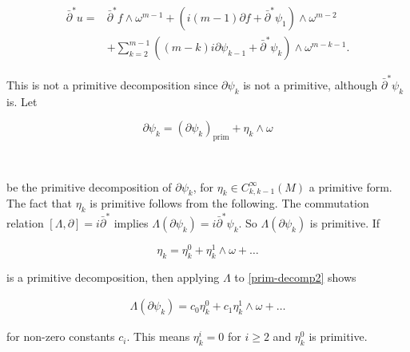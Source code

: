 \documentclass[10pt,a4paper]{amsart}
\newcommand{\sbpartial}{\bar{\partial}^*}
\newcommand{\spartial}{\partial^*}
\newcommand{\bpartial}{\bar{\partial}}
\numberwithin{equation}{section}
\begin{document}
\begin{equation}\label{del-primitive}
    \begin{aligned}
        \sbpartial u = &\sbpartial f \wedge \omega^{m-1} + ( i(m-1)\partial f + \sbpartial \psi_1) \wedge \omega^{m-2} \\
        &+ \sum_{k=2}^{m-1}((m-k)i\partial \psi_{k-1} + \sbpartial \psi_{k} )\wedge\omega^{m-k-1}.
    \end{aligned}
\end{equation}


This is not a primitive decomposition since $\partial \psi_k$ is not a primitive, although $\sbpartial \psi_{k}$ is. Let

\begin{equation}\label{prim-decomp2}
\partial \psi_k = (\partial \psi_k)_{\text{prim}} + \eta_k \wedge \omega 
\end{equation}

\

\noindent be the primitive decomposition of $\partial \psi_k$, for $\eta_k\in C^{\infty}_{k,k-1}(M)$ a primitive form. The fact that $\eta_k$ is primitive follows from the following. The commutation relation $[\Lambda, \partial] = i\bar{\partial}^*$ implies $\Lambda(\partial \psi_k) = i \sbpartial \psi_k$. So $\Lambda(\partial \psi_{k})$ is primitive. If 

$$\eta_k = \eta_k^0 + \eta_k^1 \wedge \omega + \dots $$

\noindent is a primitive decomposition, then applying $\Lambda$ to \eqref{prim-decomp2} shows

\begin{equation}
    \begin{aligned}
    \Lambda(\partial\psi_k) = c_0 \eta_k^0 + c_1 \eta_k^1 \wedge \omega + \dots
    \end{aligned}
\end{equation}


\noindent for non-zero constants $c_i$. This means $\eta_k^i=0$ for $i\geq 2$ and $\eta^0_k$ is primitive.









\end{document}
